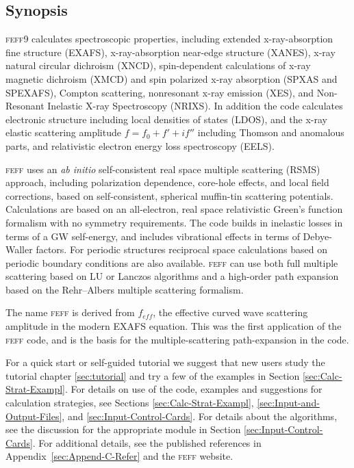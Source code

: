 \documentclass[11pt,oneside]{report} %
\newcommand{\program}[1]{\textsc{#1}}
\newcommand{\feff}{\program{feff}}
\newcommand{\vnum}{9}
\newcommand{\feffcur}{\feff\vnum}
\begin{document}
\begin{latexonly}
\setcounter{page}{1}









\chapter{Synopsis}
\label{sec:Synopsis}

{\feffcur} calculates spectroscopic properties, including
extended x-ray-absorption fine structure (EXAFS), 
x-ray-absorption near-edge structure (XANES), x-ray
natural circular dichroism (XNCD), spin-dependent calculations 
of x-ray magnetic dichroism (XMCD) and spin polarized x-ray absorption 
(SPXAS and SPEXAFS), Compton scattering, nonresonant x-ray emission (XES), and Non-Resonant
Inelastic X-ray Spectroscopy (NRIXS). 
In addition the code calculates electronic structure including local
densities of states (LDOS), and the x-ray elastic scattering amplitude
$f=f_0+f'+if''$ including Thomson and anomalous parts, and relativistic
electron energy loss spectroscopy (EELS). 

{\feff} uses an \textit{ab initio} self-consistent real space multiple 
scattering (RSMS) approach, including 
polarization dependence, core\--hole effects, and local field 
corrections, based on self-consistent, spherical muffin-tin scattering
potentials.  Calculations are based on an all-electron, real space 
relativistic Green's function formalism with no symmetry requirements.
The code builds in inelastic losses in terms of a GW self-energy,
and includes vibrational effects in terms of Debye-Waller
factors.  For periodic structures reciprocal space calculations based on
periodic boundary conditions are also available.
{\feff} can use both full multiple scattering based on LU or Lanczos 
algorithms and a high-order path expansion based on the Rehr--Albers 
multiple scattering formalism.

The name {\feff} is derived from $f_{eff}$, the effective curved wave
scattering amplitude in the modern EXAFS equation.  This was the first
application of the {\feff} code, and is the basis for the 
multiple-scattering path-expansion in the code.

For a quick start or self-guided tutorial
we suggest that new users study the tutorial chapter \ref{sec:tutorial} and try a few of the examples in Section
\ref{sec:Calc-Strat-Exampl}. For details on use of the code, examples
and suggestions for calculation strategies, see Sections
\ref{sec:Calc-Strat-Exampl}, \ref{sec:Input-and-Output-Files}, and \ref{sec:Input-Control-Cards}. For details about the algorithms,
see the discussion for the appropriate module in Section
\ref{sec:Input-Control-Cards}.  For additional details, see the published
references in Appendix~\ref{sec:Append-C-Refer} and the {\feff} website.


\end{latexonly}
\end{document}
